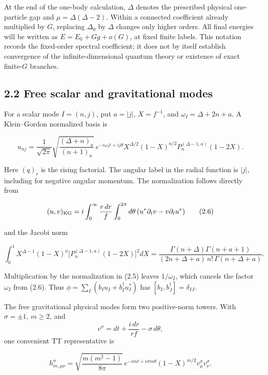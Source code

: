 At the end of the one-body calculation, \(\Delta\) denotes the prescribed physical one-particle gap and \(\mu=\Delta(\Delta-2)\). Within a connected coefficient already multiplied by \(G\), replacing \(\Delta_0\) by \(\Delta\) changes only higher orders. All final energies will be written as \(E=E_0+Gg+o(G)\), at fixed finite labels. This notation records the fixed-order spectral coefficient; it does not by itself establish convergence of the infinite-dimensional quantum theory or existence of exact finite-\(G\) branches.

\hypertarget{free-scalar-and-gravitational-modes}{%
\subsection{2.2 Free scalar and gravitational modes}\label{free-scalar-and-gravitational-modes}}

For a scalar mode \(I=(n,j)\), put \(a=|j|\), \(X=f^{-1}\), and \(\omega_I=\Delta+2n+a\). A Klein--Gordon normalized basis is

\[
u_{nj}=
\frac1{\sqrt{2\pi}}
\sqrt{\frac{(\Delta+n)_a}{(n+1)_a}}\,
e^{-i\omega_I t+ij\theta}
X^{\Delta/2}(1-X)^{a/2}
P_n^{(\Delta-1,a)}(1-2X).
\tag{2.5}
\]

Here \((q)_r\) is the rising factorial. The angular label in the radial function is \(|j|\), including for negative angular momentum. The normalization follows directly from

\[
(u,v)_{\rm KG}
=i\int_0^\infty\frac{r\,dr}{f}\int_0^{2\pi}d\theta\,
(u^*\partial_tv-v\partial_tu^*)
\tag{2.6}
\]

and the Jacobi norm

\[
\int_0^1 X^{\Delta-1}(1-X)^a
\bigl[P_n^{(\Delta-1,a)}(1-2X)\bigr]^2dX
=
\frac{\Gamma(n+\Delta)\Gamma(n+a+1)}
{(2n+\Delta+a)\,n!\,\Gamma(n+\Delta+a)}.
\tag{2.7}
\]

Multiplication by the normalization in (2.5) leaves \(1/\omega_I\), which cancels the factor \(\omega_I\) from (2.6). Thus \(\phi=\sum_I(b_Iu_I+b_I^\dagger u_I^*)\) has \([b_I,b_J^\dagger]=\delta_{IJ}\).

The free gravitational physical modes form two positive-norm towers. With \(\sigma=\pm1\), \(m\ge2\), and \[
v^\sigma=dt+\frac{i\,dr}{rf}-\sigma\,d\theta ,
\] one convenient TT representative is

\[
h^\sigma_{m,\mu\nu}
=\sqrt{\frac{m(m^2-1)}{8\pi}}\,
e^{-imt+i\sigma m\theta}
(1-X)^{m/2}v^\sigma_\mu v^\sigma_\nu .
\tag{2.8}
\]

